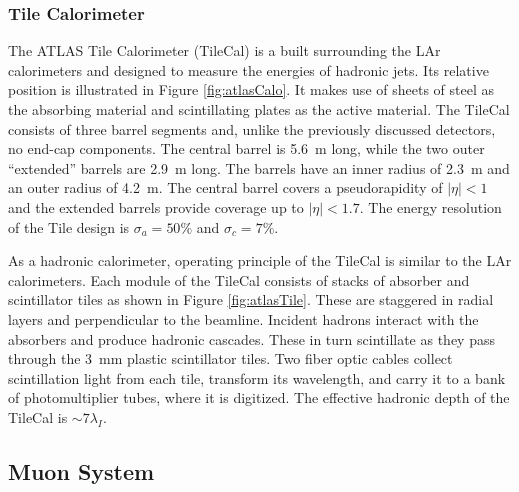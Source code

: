 \subsubsection{Tile Calorimeter}

The ATLAS Tile Calorimeter (TileCal) is a built surrounding the LAr calorimeters and designed to measure the energies of hadronic jets.
Its relative position is illustrated in Figure \ref{fig:atlasCalo}.
It makes use of sheets of steel as the absorbing material and scintillating plates as the active material.
The TileCal consists of three barrel segments and, unlike the previously discussed detectors, no end-cap components.
The central barrel is 5.6~m long, while the two outer ``extended'' barrels are 2.9~m long.
The barrels have an inner radius of 2.3~m and an outer radius of 4.2~m.
The central barrel covers a pseudorapidity of $|\eta|<1$ and the extended barrels provide coverage up to $|\eta|<1.7$.
The energy resolution of the Tile design is $\sigma_a=50\%$ and $\sigma_c=7\%$.
\cite{tileTdr}

As a hadronic calorimeter, operating principle of the TileCal is similar to the LAr calorimeters. 
Each module of the TileCal consists of stacks of absorber and scintillator tiles as shown in Figure \ref{fig:atlasTile}.
These are staggered in radial layers and perpendicular to the beamline.
Incident hadrons interact with the absorbers and produce hadronic cascades.
These in turn scintillate as they pass through the 3~mm plastic scintillator tiles.
Two fiber optic cables collect scintillation light from each tile, transform its wavelength, and carry it to a bank of photomultiplier tubes, where it is digitized.
The effective hadronic depth of the TileCal is $\sim7\lambda_I$.
\cite{tile}

\subsection{Muon System}

